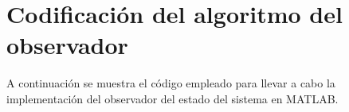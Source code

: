 \chapter{Codificación del algoritmo del observador}
\label{app:implemObservador}

A continuación se muestra el código empleado para llevar a cabo la implementación del observador del estado del sistema en MATLAB. \\ \par 

